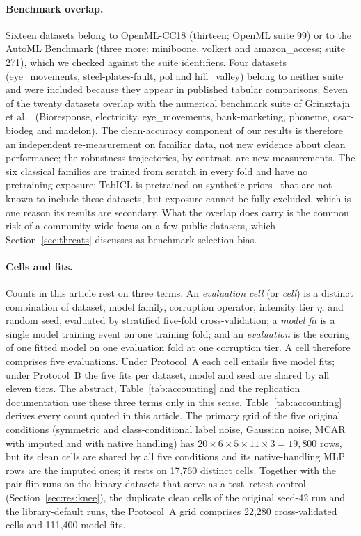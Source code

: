 \documentclass[pdflatex,sn-mathphys]{sn-jnl}
\theoremstyle{thmstyleone}
\theoremstyle{thmstyletwo}
\theoremstyle{thmstylethree}
\begin{document}
\paragraph{Benchmark overlap.} Sixteen datasets belong to OpenML-CC18 (thirteen; OpenML suite 99) or to the AutoML Benchmark (three more: miniboone, volkert and amazon\_access; suite 271), which we checked against the suite identifiers. Four datasets (eye\_movements, steel-plates-fault, pol and hill\_valley) belong to neither suite and were included because they appear in published tabular comparisons. Seven of the twenty datasets overlap with the numerical benchmark suite of Grinsztajn et al.~\cite{grinsztajn2022tree} (Bioresponse, electricity, eye\_movements, bank-marketing, phoneme, qsar-biodeg and madelon). The clean-accuracy component of our results is therefore an independent re-measurement on familiar data, not new evidence about clean performance; the robustness trajectories, by contrast, are new measurements. The six classical families are trained from scratch in every fold and have no pretraining exposure; TabICL is pretrained on synthetic priors~\cite{qu2025tabicl} that are not known to include these datasets, but exposure cannot be fully excluded, which is one reason its results are secondary. What the overlap does carry is the common risk of a community-wide focus on a few public datasets, which Section~\ref{sec:threats} discusses as benchmark selection bias.

\paragraph{Cells and fits.} Counts in this article rest on three terms. An \emph{evaluation cell} (or \emph{cell}) is a distinct combination of dataset, model family, corruption operator, intensity tier $\eta$, and random seed, evaluated by stratified five-fold cross-validation; a \emph{model fit} is a single model training event on one training fold; and an \emph{evaluation} is the scoring of one fitted model on one evaluation fold at one corruption tier. A cell therefore comprises five evaluations. Under Protocol~A each cell entails five model fits; under Protocol~B the five fits per dataset, model and seed are shared by all eleven tiers. The abstract, Table~\ref{tab:accounting} and the replication documentation use these three terms only in this sense. Table~\ref{tab:accounting} derives every count quoted in this article. The primary grid of the five original conditions (symmetric and class-conditional label noise, Gaussian noise, MCAR with imputed and with native handling) has $20\times6\times5\times11\times3=19{,}800$ rows, but its clean cells are shared by all five conditions and its native-handling MLP rows are the imputed ones; it rests on 17{,}760 distinct cells. Together with the pair-flip runs on the binary datasets that serve as a test--retest control (Section~\ref{sec:res:knee}), the duplicate clean cells of the original seed-42 run and the library-default runs, the Protocol~A grid comprises 22{,}280 cross-validated cells and 111{,}400 model fits.
\end{document}
